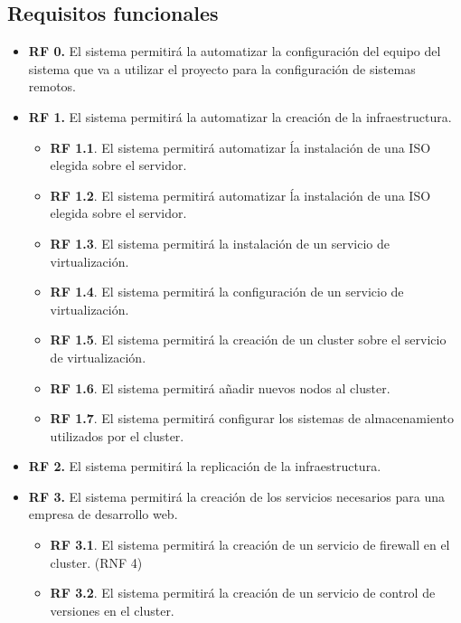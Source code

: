         \subsection{Requisitos funcionales}
        \begin{itemize}
                \item \textbf{RF 0.} El sistema permitirá la automatizar la configuración del equipo del sistema que va a utilizar el proyecto para la configuración de sistemas remotos.
                \item \textbf{RF 1.} El sistema permitirá la automatizar la creación de la infraestructura.
                \begin{itemize}
                        \item \textbf{RF 1.1}. El sistema permitirá automatizar ĺa instalación de una ISO elegida sobre el servidor.
                        \item \textbf{RF 1.2}. El sistema permitirá automatizar ĺa instalación de una ISO elegida sobre el servidor.
                        \item \textbf{RF 1.3}. El sistema permitirá la instalación de un servicio de virtualización. 
                        \item \textbf{RF 1.4}. El sistema permitirá la configuración de un servicio de virtualización.
                        \item \textbf{RF 1.5}. El sistema permitirá la creación de un cluster sobre el servicio de virtualización.
                        \item \textbf{RF 1.6}. El sistema permitirá añadir nuevos nodos al cluster.
                        \item \textbf{RF 1.7}. El sistema permitirá configurar los sistemas de almacenamiento utilizados por el cluster.
                \end{itemize}
                \item \textbf{RF 2.} El sistema permitirá la replicación de la infraestructura.
                \item \textbf{RF 3.} El sistema permitirá la creación de los servicios necesarios para una empresa de desarrollo web.
                \begin{itemize}
                        \item \textbf{RF 3.1}. El sistema permitirá la creación de un servicio de firewall en el cluster. (RNF 4)
                        \item \textbf{RF 3.2}. El sistema permitirá la creación de un servicio de control de versiones en el cluster.

\end{itemize}
\end{itemize}
